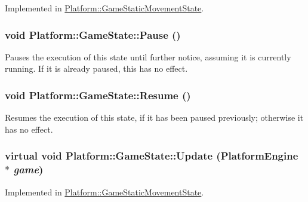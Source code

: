 Implemented in \hyperlink{class_platform_1_1_game_static_movement_state_751b633b6a42bf1a85a9081f31dac4e1}{Platform::GameStaticMovementState}.\hypertarget{class_platform_1_1_game_state_aa49568d0da70ded81719cfa83052028}{
\subsubsection[{Pause}]{\setlength{\rightskip}{0pt plus 5cm}void Platform::GameState::Pause ()}}
\label{d4/d4f/class_platform_1_1_game_state_aa49568d0da70ded81719cfa83052028}


Pauses the execution of this state until further notice, assuming it is currently running. If it is already paused, this has no effect. \hypertarget{class_platform_1_1_game_state_d2a5e5f3ba807bbf9445baba9f36fea7}{
\subsubsection[{Resume}]{\setlength{\rightskip}{0pt plus 5cm}void Platform::GameState::Resume ()}}
\label{d4/d4f/class_platform_1_1_game_state_d2a5e5f3ba807bbf9445baba9f36fea7}


Resumes the execution of this state, if it has been paused previously; otherwise it has no effect. \hypertarget{class_platform_1_1_game_state_d39851d7ffd329b2005f1d2c72cf65a2}{
\subsubsection[{Update}]{\setlength{\rightskip}{0pt plus 5cm}virtual void Platform::GameState::Update ({\bf PlatformEngine} $\ast$ {\em game})}}
\label{d4/d4f/class_platform_1_1_game_state_d39851d7ffd329b2005f1d2c72cf65a2}




Implemented in \hyperlink{class_platform_1_1_game_static_movement_state_07ccc3a9b700867379fae0745451ceff}{Platform::GameStaticMovementState}.

